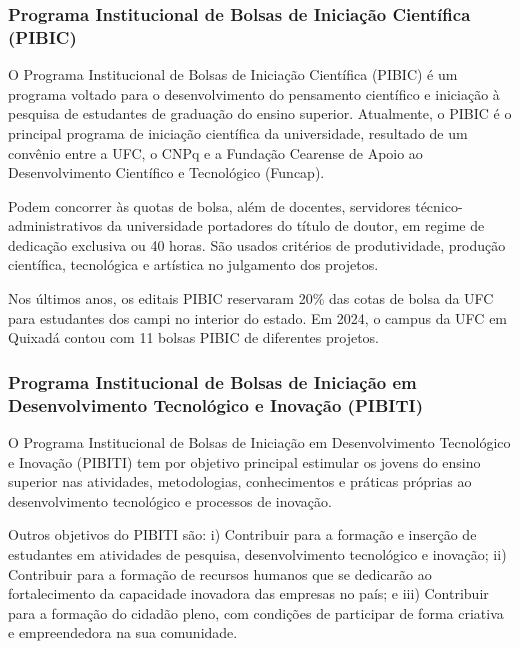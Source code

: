 
\subsubsection{Programa Institucional de Bolsas de Iniciação Científica (PIBIC)}

O Programa Institucional de Bolsas de Iniciação Científica (PIBIC) é um programa voltado para o desenvolvimento do pensamento científico e iniciação à pesquisa de estudantes de graduação do ensino superior. Atualmente, o PIBIC é o principal programa de iniciação científica da universidade, resultado de um convênio entre a UFC, o CNPq e a Fundação Cearense de Apoio ao Desenvolvimento Científico e Tecnológico (Funcap).



Podem concorrer às quotas de bolsa, além de docentes, servidores técnico-administrativos da universidade portadores do título de doutor, em regime de dedicação exclusiva ou 40 horas. São usados critérios de produtividade, produção científica, tecnológica e artística no julgamento dos projetos.

Nos últimos anos, os editais PIBIC reservaram 20\% das cotas de bolsa da UFC para estudantes dos campi no interior do estado. Em 2024, o campus da UFC em Quixadá contou com 11 bolsas PIBIC de diferentes projetos. 

\subsubsection{ Programa Institucional de Bolsas de Iniciação em Desenvolvimento Tecnológico e Inovação (PIBITI)}

O Programa Institucional de Bolsas de Iniciação em Desenvolvimento Tecnológico e Inovação (PIBITI) tem por objetivo principal estimular os jovens do ensino superior nas atividades, metodologias, conhecimentos e práticas próprias ao desenvolvimento tecnológico e processos de inovação. 

Outros objetivos do PIBITI são: i) Contribuir para a formação e inserção de estudantes em atividades de pesquisa, desenvolvimento tecnológico e inovação; ii) Contribuir para a formação de recursos humanos que se dedicarão ao fortalecimento da capacidade inovadora das empresas no país; e iii) Contribuir para a formação do cidadão pleno, com condições de participar de forma criativa e empreendedora na sua comunidade.


